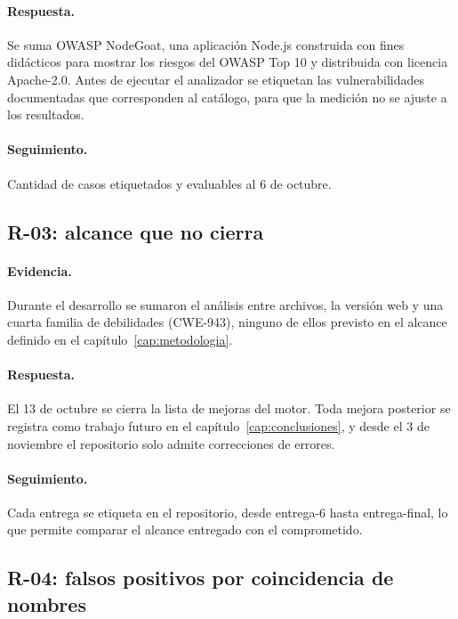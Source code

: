 \paragraph{Respuesta.} Se suma OWASP NodeGoat, una aplicación Node.js construida con fines didácticos para mostrar los riesgos del OWASP Top 10 y distribuida con licencia Apache-2.0. Antes de ejecutar el analizador se etiquetan las vulnerabilidades documentadas que corresponden al catálogo, para que la medición no se ajuste a los resultados.

\paragraph{Seguimiento.} Cantidad de casos etiquetados y evaluables al 6 de octubre.

\subsection{R-03: alcance que no cierra}\label{sec:n6.4.3}

\paragraph{Evidencia.} Durante el desarrollo se sumaron el análisis entre archivos, la versión web y una cuarta familia de debilidades (CWE-943), ninguno de ellos previsto en el alcance definido en el capítulo~\ref{cap:metodologia}.

\paragraph{Respuesta.} El 13 de octubre se cierra la lista de mejoras del motor. Toda mejora posterior se registra como trabajo futuro en el capítulo~\ref{cap:conclusiones}, y desde el 3 de noviembre el repositorio solo admite correcciones de errores.

\paragraph{Seguimiento.} Cada entrega se etiqueta en el repositorio, desde entrega-6 hasta entrega-final, lo que permite comparar el alcance entregado con el comprometido.

\subsection{R-04: falsos positivos por coincidencia de nombres}\label{sec:n6.4.4}


